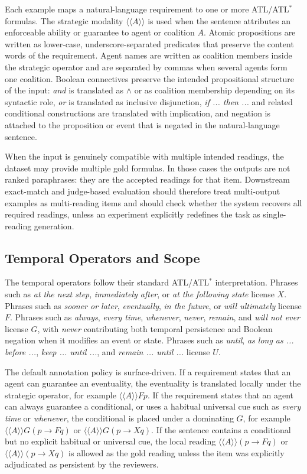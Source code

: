 \documentclass[letterpaper]{article}
\newcommand{\atl}[1]{\ensuremath{\langle\!\langle #1 \rangle\!\rangle}}
\begin{document}
Each example maps a natural-language requirement to one or more ATL/ATL$^\ast$ formulas. The strategic modality $\atl{A}$ is used when the sentence attributes an enforceable ability or guarantee to agent or coalition $A$. Atomic propositions are written as lower-case, underscore-separated predicates that preserve the content words of the requirement. Agent names are written as coalition members inside the strategic operator and are separated by commas when several agents form one coalition. Boolean connectives preserve the intended propositional structure of the input: \emph{and} is translated as $\wedge$ or as coalition membership depending on its syntactic role, \emph{or} is translated as inclusive disjunction, \emph{if ... then ...} and related conditional constructions are translated with implication, and negation is attached to the proposition or event that is negated in the natural-language sentence.

When the input is genuinely compatible with multiple intended readings, the dataset may provide multiple gold formulas. In those cases the outputs are not ranked paraphrases: they are the accepted readings for that item. Downstream exact-match and judge-based evaluation should therefore treat multi-output examples as multi-reading items and should check whether the system recovers all required readings, unless an experiment explicitly redefines the task as single-reading generation.

\subsection{Temporal Operators and Scope}

The temporal operators follow their standard ATL/ATL$^\ast$ interpretation. Phrases such as \emph{at the next step}, \emph{immediately after}, or \emph{at the following state} license $X$. Phrases such as \emph{sooner or later}, \emph{eventually}, \emph{in the future}, or \emph{will ultimately} license $F$. Phrases such as \emph{always}, \emph{every time}, \emph{whenever}, \emph{never}, \emph{remain}, and \emph{will not ever} license $G$, with \emph{never} contributing both temporal persistence and Boolean negation when it modifies an event or state. Phrases such as \emph{until}, \emph{as long as ... before ...}, \emph{keep ... until ...}, and \emph{remain ... until ...} license $U$.

The default annotation policy is surface-driven. If a requirement states that an agent can guarantee an eventuality, the eventuality is translated locally under the strategic operator, for example $\atl{A}F p$. If the requirement states that an agent can always guarantee a conditional, or uses a habitual universal cue such as \emph{every time} or \emph{whenever}, the conditional is placed under a dominating $G$, for example $\atl{A}G(p \rightarrow F q)$ or $\atl{A}G(p \rightarrow X q)$. If the sentence contains a conditional but no explicit habitual or universal cue, the local reading $\atl{A}(p \rightarrow F q)$ or $\atl{A}(p \rightarrow X q)$ is allowed as the gold reading unless the item was explicitly adjudicated as persistent by the reviewers.
\end{document}
